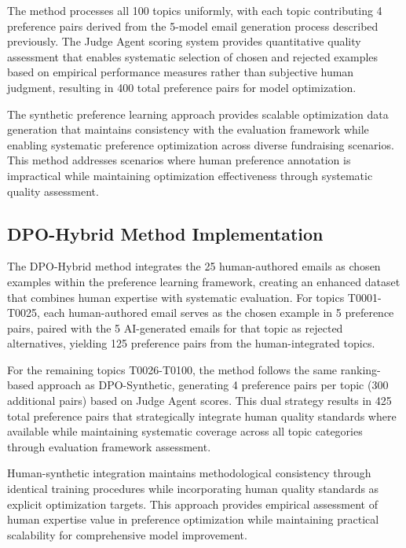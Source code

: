 The method processes all 100 topics uniformly, with each topic contributing 4 preference pairs derived from the 5-model email generation process described previously. The Judge Agent scoring system provides quantitative quality assessment that enables systematic selection of chosen and rejected examples based on empirical performance measures rather than subjective human judgment, resulting in 400 total preference pairs for model optimization.

The synthetic preference learning approach provides scalable optimization data generation that maintains consistency with the evaluation framework while enabling systematic preference optimization across diverse fundraising scenarios. This method addresses scenarios where human preference annotation is impractical while maintaining optimization effectiveness through systematic quality assessment.

\subsection{DPO-Hybrid Method Implementation}

The DPO-Hybrid method integrates the 25 human-authored emails as chosen examples within the preference learning framework, creating an enhanced dataset that combines human expertise with systematic evaluation. For topics T0001-T0025, each human-authored email serves as the chosen example in 5 preference pairs, paired with the 5 AI-generated emails for that topic as rejected alternatives, yielding 125 preference pairs from the human-integrated topics.

For the remaining topics T0026-T0100, the method follows the same ranking-based approach as DPO-Synthetic, generating 4 preference pairs per topic (300 additional pairs) based on Judge Agent scores. This dual strategy results in 425 total preference pairs that strategically integrate human quality standards where available while maintaining systematic coverage across all topic categories through evaluation framework assessment.

Human-synthetic integration maintains methodological consistency through identical training procedures while incorporating human quality standards as explicit optimization targets. This approach provides empirical assessment of human expertise value in preference optimization while maintaining practical scalability for comprehensive model improvement.

